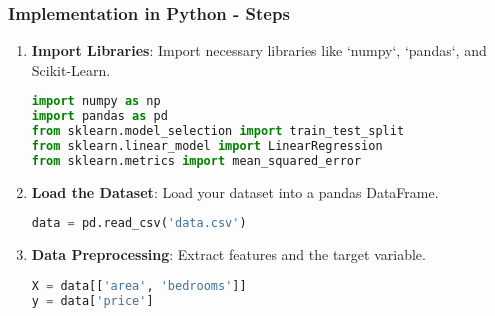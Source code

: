 \documentclass[aspectratio=169]{beamer}
\begin{document}
\begin{frame}[fragile]
    \frametitle{Implementation in Python - Steps}
    \begin{enumerate}
        \item \textbf{Import Libraries}: Import necessary libraries like `numpy`, `pandas`, and Scikit-Learn.
        
        \begin{lstlisting}[language=Python]
import numpy as np
import pandas as pd
from sklearn.model_selection import train_test_split
from sklearn.linear_model import LinearRegression
from sklearn.metrics import mean_squared_error
        \end{lstlisting}
        
        \item \textbf{Load the Dataset}: Load your dataset into a pandas DataFrame.
        
        \begin{lstlisting}[language=Python]
data = pd.read_csv('data.csv')
        \end{lstlisting}
        
        \item \textbf{Data Preprocessing}: Extract features and the target variable.
        
        \begin{lstlisting}[language=Python]
X = data[['area', 'bedrooms']]
y = data['price']
        \end{lstlisting}
    \end{enumerate}
\end{frame}
\end{document}
